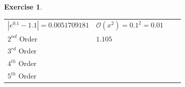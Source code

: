 \documentclass[
]{book}
\theoremstyle{definition}
\theoremstyle{definition}
\theoremstyle{definition}
\newtheorem{exercise}{Exercise}[chapter]
\theoremstyle{remark}
\begin{document}
\begin{exercise}
\begin{longtable}[]{@{}llll@{}}
\begin{minipage}[t]{0.23\columnwidth}
\(|e^{0.1}-1.1| = 0.0051709181\)\strut
\end{minipage} & \begin{minipage}[t]{0.19\columnwidth}\raggedright
\(\mathcal{O}(x^2) = 0.1^2 = 0.01\)\strut
\end{minipage}\tabularnewline
\begin{minipage}[t]{0.23\columnwidth}\raggedright
\(2^{nd}\) Order\strut
\end{minipage} & \begin{minipage}[t]{0.23\columnwidth}\raggedright
\(1.105\)\strut
\end{minipage} & \begin{minipage}[t]{0.23\columnwidth}\raggedright
\strut
\end{minipage} & \begin{minipage}[t]{0.19\columnwidth}\raggedright
\strut
\end{minipage}\tabularnewline
\begin{minipage}[t]{0.23\columnwidth}\raggedright
\(3^{rd}\) Order\strut
\end{minipage} & \begin{minipage}[t]{0.23\columnwidth}\raggedright
\strut
\end{minipage} & \begin{minipage}[t]{0.23\columnwidth}\raggedright
\strut
\end{minipage} & \begin{minipage}[t]{0.19\columnwidth}\raggedright
\strut
\end{minipage}\tabularnewline
\begin{minipage}[t]{0.23\columnwidth}\raggedright
\(4^{th}\) Order\strut
\end{minipage} & \begin{minipage}[t]{0.23\columnwidth}\raggedright
\strut
\end{minipage} & \begin{minipage}[t]{0.23\columnwidth}\raggedright
\strut
\end{minipage} & \begin{minipage}[t]{0.19\columnwidth}\raggedright
\strut
\end{minipage}\tabularnewline
\begin{minipage}[t]{0.23\columnwidth}\raggedright
\(5^{th}\) Order\strut
\end{minipage} & \begin{minipage}[t]{0.23\columnwidth}\raggedright
\strut
\end{minipage} & \begin{minipage}[t]{0.23\columnwidth}\raggedright
\strut
\end{minipage} & \begin{minipage}[t]{0.19\columnwidth}\raggedright
\strut
\end{minipage}\tabularnewline
\bottomrule
\end{longtable}
\end{exercise}
\end{document}
